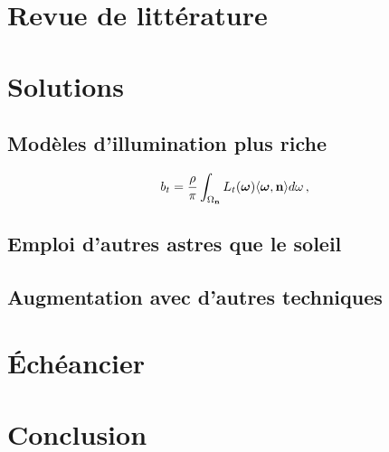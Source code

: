 \documentclass{report}
\begin{document}
\chapter{Revue de littérature}

\cite{Hold-Geoffroy-3DV15,Hold-Geoffroy-ICCP15}


\chapter{Solutions}

\section{Modèles d'illumination plus riche}

\begin{equation}
b_t = \frac{\rho}{\pi} \int_{\Omega_{\bf n}} L_t(\mathbf{\boldsymbol \omega}) \langle \boldsymbol \omega, {\bf n} \rangle d\omega \,,
\end{equation}

\section{Emploi d'autres astres que le soleil}

\section{Augmentation avec d'autres techniques}


\chapter{Échéancier}


\chapter{Conclusion}\label{conclusion}


{\small
%

}
\end{document}
